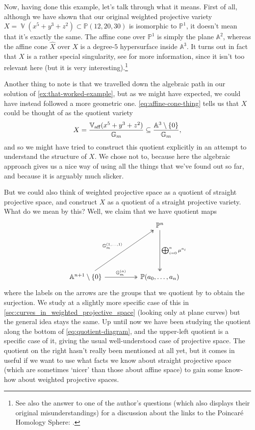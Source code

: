 \documentclass[10pt,notitlepage]{article}
\numberwithin{equation}{subsection}
\DeclareMathOperator{\van}{\mathbb{V}}
\DeclareMathOperator{\vanaff}{\mathbb{V}_{\textnormal{aff}}}
\newcommand{\aff}{\mathbb{A}}
\newcommand{\pee}{\mathbb{P}}
\newcommand{\gm}{\mathbb{G}_m}
\newcommand{\noz}{\setminus\{0\}}
\newcommand{\pazn}{\pee(a_0,\ldots,a_n)}
\begin{document}
    Now, having done this example, let's talk through what it means.
    First of all, although we have shown that our original weighted projective variety $X=\van(x^5+y^3+z^2)\subset\pee(12,20,30)$ is isomorphic to $\pee^1$, it doesn't mean that it's exactly the same.
    The affine cone over $\pee^1$ is simply the plane $\aff^2$, whereas the affine cone $\hat{X}$ over $X$ is a degree-$5$ hypersurface inside $\aff^3$.
    It turns out in fact that $X$ is a rather special singularity, see \cite[Example~3.7]{Reid:2002uy} for more information, since it isn't too relevant here (but it is very interesting).\footnote{%
        See also the answer to one of the author's questions (which also displays their original misunderstandings) for a discussion about the links to the Poincaré Homology Sphere: \cite{1426420}.
    }

    Another thing to note is that we travelled down the algebraic path in our solution of \cref{ex:that-worked-example}, but as we might have expected, we could have instead followed a more geometric one.
    \cref{eq:affine-cone-thing} tells us that $X$ could be thought of as the quotient variety
    \[
        X = \frac{\vanaff(x^5+y^3+z^2)}{\gm} \subseteq \frac{\aff^3\noz}{\gm},
    \]
    and so we might have tried to construct this quotient explicitly in an attempt to understand the structure of $X$.
    We chose not to, because here the algebraic approach gives us a nice way of using all the things that we've found out so far, and because it is arguably much slicker.

    But we could also think of weighted projective space as a quotient of straight projective space, and construct $X$ as a quotient of a straight projective variety.
    What do we mean by this?
    Well, we claim that we have quotient maps
    \begin{equation}\label{eq:quotient-diagram}
        \begin{tikzcd}[column sep=huge, row sep=6em]
            & \pee^n \dar[two heads]{\bigoplus_{i=0}^n\mu^{a_i}} \\
            \aff^{n+1}\noz \rar[two heads]{\gm^{(a)}} \urar[two heads]{\gm^{(1,\ldots,1)}} & \pazn
        \end{tikzcd}
    \end{equation}
    where the labels on the arrows are the groups that we quotient by to obtain the surjection.
    We study at a slightly more specific case of this in \cref{sec:curves_in_weighted_projective_space} (looking only at plane curves) but the general idea stays the same.
    Up until now we have been studying the quotient along the bottom of \cref{eq:quotient-diagram}, and the upper-left quotient is a specific case of it, giving the usual well-understood case of projective space.
    The quotient on the right hasn't really been mentioned at all yet, but it comes in useful if we want to use what facts we know about straight projective space (which are sometimes `nicer' than those about affine space) to gain some know-how about weighted projective spaces.
\end{document}
